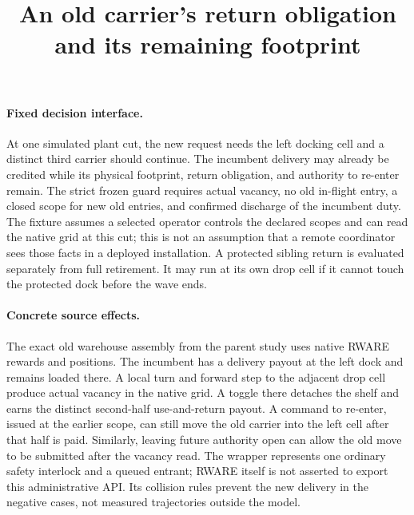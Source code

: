 \documentclass{article}
\title{An old carrier's return obligation and its remaining footprint}
\author{}\date{}
\begin{document}
\maketitle

\paragraph{Fixed decision interface.}
At one simulated plant cut, the new request needs the left docking cell
and a distinct third carrier should continue. The incumbent delivery
may already be credited while its physical footprint, return obligation,
and authority to re-enter remain. The strict frozen guard requires actual
vacancy, no old in-flight entry, a closed scope for new old entries,
and confirmed discharge of the incumbent duty. The fixture assumes a
selected operator controls the declared scopes and can read the native
grid at this cut; this is not an assumption that a remote coordinator
sees those facts in a deployed installation. A protected sibling return
is evaluated separately from full retirement. It may run at its own
drop cell if it cannot touch the protected dock before the wave ends.

\paragraph{Concrete source effects.}
The exact old warehouse assembly from the parent study uses native
RWARE rewards and positions. The incumbent has a delivery payout at the
left dock and remains loaded there. A local turn and forward step to the
adjacent drop cell produce actual vacancy in the native grid. A toggle
there detaches the shelf and earns the distinct second-half use-and-return
payout. A command to re-enter, issued at the earlier scope, can still
move the old carrier into the left cell after that half is paid.
Similarly, leaving future authority open can allow the old move to be
submitted after the vacancy read. The wrapper represents one ordinary
safety interlock and a queued entrant; RWARE itself is not asserted to
export this administrative API. Its collision rules prevent the new
delivery in the negative cases, not measured trajectories outside the model.
\end{document}

